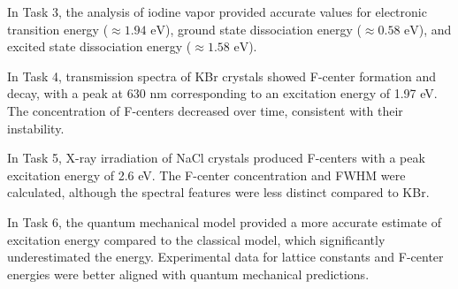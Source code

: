 \documentclass{article}
\begin{document}
In Task 3, the analysis of iodine vapor provided accurate values for electronic transition energy (\( \approx 1.94 \text{ eV} \)), ground state dissociation energy (\( \approx 0.58 \text{ eV} \)), and excited state dissociation energy (\( \approx 1.58 \text{ eV} \)).

In Task 4, transmission spectra of KBr crystals showed F-center formation and decay, with a peak at 630 nm corresponding to an excitation energy of 1.97 eV. The concentration of F-centers decreased over time, consistent with their instability.

In Task 5, X-ray irradiation of NaCl crystals produced F-centers with a peak excitation energy of 2.6 eV. The F-center concentration and FWHM were calculated, although the spectral features were less distinct compared to KBr.

In Task 6, the quantum mechanical model provided a more accurate estimate of excitation energy compared to the classical model, which significantly underestimated the energy. Experimental data for lattice constants and F-center energies were better aligned with quantum mechanical predictions.

\pagebreak{}

 
 
\end{document}
